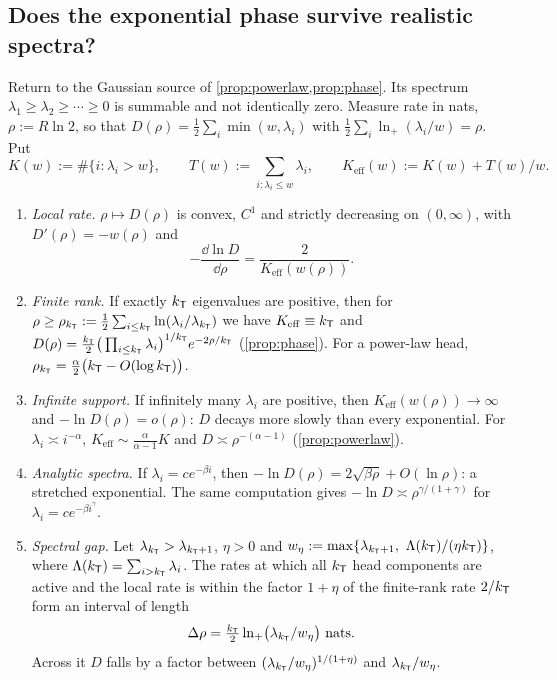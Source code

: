 \subsection{Does the exponential phase survive realistic spectra?}\label{sec:law-expo}

Return to the Gaussian source of \cref{prop:powerlaw,prop:phase}. Its spectrum $\lambda_1\ge\lambda_2\ge\cdots\ge0$ is summable and
not identically zero. Measure rate in nats, $\rho:=R\ln2$, so that $D(\rho)=\frac12\sum_i\min(w,\lambda_i)$ with
$\frac12\sum_i\ln_+(\lambda_i/w)=\rho$. Put
\[
K(w):=\#\{i:\lambda_i>w\},\qquad T(w):=\sum_{i:\lambda_i\le w}\lambda_i,\qquad K_{\mathrm{eff}}(w):=K(w)+T(w)/w .
\]

\begin{theorem}\label{thm:expo}
\Pv\Ck
\begin{enumerate}[label=(\roman*),nosep,leftmargin=*]
\item \emph{Local rate.} $\rho\mapsto D(\rho)$ is convex, $C^1$ and strictly decreasing on $(0,\infty)$, with $D'(\rho)=-w(\rho)$ and
\[
-\frac{\dd\ln D}{\dd\rho}=\frac2{K_{\mathrm{eff}}(w(\rho))}.
\]
\item \emph{Finite rank.} If exactly $k_{\mathsf{T}}$ eigenvalues are positive, then for
$\rho\ge\rho_{k_{\mathsf{T}}}:=\frac12\sum_{i\le k_{\mathsf{T}}}\ln(\lambda_i/\lambda_{k_{\mathsf{T}}})$ we have $K_{\mathrm{eff}}\equiv k_{\mathsf{T}}$ and
$D(\rho)=\frac{k_{\mathsf{T}}}2\big(\prod_{i\le k_{\mathsf{T}}}\lambda_i\big)^{1/k_{\mathsf{T}}}e^{-2\rho/k_{\mathsf{T}}}$ (\cref{prop:phase}). For a power-law head,
$\rho_{k_{\mathsf{T}}}=\frac\alpha2\big(k_{\mathsf{T}}-O(\log k_{\mathsf{T}})\big)$.
\item \emph{Infinite support.} If infinitely many $\lambda_i$ are positive, then $K_{\mathrm{eff}}(w(\rho))\to\infty$ and
$-\ln D(\rho)=o(\rho)$: $D$ decays more slowly than every exponential. For $\lambda_i\asymp i^{-\alpha}$,
$K_{\mathrm{eff}}\sim\frac\alpha{\alpha-1}K$ and $D\asymp\rho^{-(\alpha-1)}$ (\cref{prop:powerlaw}).
\item \emph{Analytic spectra.} If $\lambda_i=ce^{-\beta i}$, then $-\ln D(\rho)=2\sqrt{\beta\rho}+O(\ln\rho)$: a stretched exponential.
The same computation gives $-\ln D\asymp\rho^{\gamma/(1+\gamma)}$ for $\lambda_i=ce^{-\beta i^\gamma}$.
\item \emph{Spectral gap.} Let $\lambda_{k_{\mathsf{T}}}>\lambda_{k_{\mathsf{T}}+1}$, $\eta>0$ and $w_\eta:=\max\{\lambda_{k_\TT+1},\ \Lambda(k_\TT)/(\eta k_\TT)\}$, where
$\Lambda(k_{\mathsf{T}})=\sum_{i>k_{\mathsf{T}}}\lambda_i$. The rates at which all $k_{\mathsf{T}}$ head components are active and the local rate
is within the factor $1+\eta$ of the finite-rank rate $2/k_{\mathsf{T}}$ form an interval of length
\[
\Delta\rho=\tfrac{k_\TT}2\ln_+\!\big(\lambda_{k_\TT}/w_\eta\big)\ \text{nats}.
\]
Across it $D$ falls by a factor between $(\lambda_{k_{\mathsf{T}}}/w_\eta)^{1/(1+\eta)}$ and $\lambda_{k_{\mathsf{T}}}/w_\eta$.
\end{enumerate}
\end{theorem}
